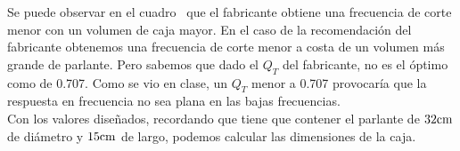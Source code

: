 \begin{table}[H]  %

    \setlength\arrayrulewidth{1.5pt}
    \def\clinecolor{\hhline{|>{\arrayrulecolor{white}}-%
    >{\arrayrulecolor{white}}|-|-|-|}}
	\caption{\footnotesize{Comparación de los valores diseñados con los recomendados por el fabricante.}}
	\label{table:table_comparison_recomendations}
\end{table}


Se puede observar en el cuadro~ que el fabricante obtiene una frecuencia de corte menor con un volumen de caja mayor. En el caso de la recomendación del fabricante obtenemos una frecuencia de corte menor a costa de un volumen más grande de parlante. Pero sabemos que dado el $Q_{T}$ del fabricante, no es el óptimo como de \num{0.707}. Como se vio en clase, un $Q_{T}$ menor a \num{0.707} provocaría que la respuesta en frecuencia no sea plana en las bajas frecuencias.\\


Con los valores diseñados, recordando que tiene que contener el parlante de $32 \si[per-mode=symbol]{\centi\meter}$ de diámetro y $15 \si[per-mode=symbol]{\centi\meter}$ de largo, podemos calcular las dimensiones de la caja.

